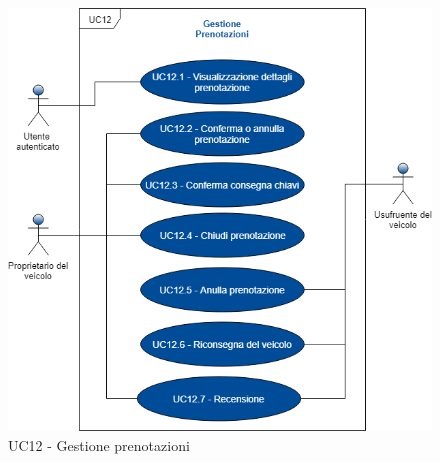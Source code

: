 \begin{figure}[h]
	\includegraphics[width=12cm]{res/images/UC12Prenotazioni.png}
	\centering
	\caption{UC12 - Gestione prenotazioni}
\end{figure}
